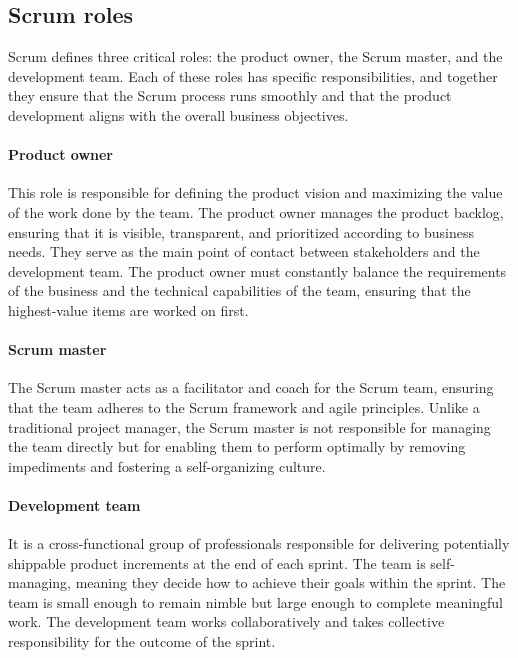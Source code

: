 \subsection{Scrum roles}

Scrum defines three critical roles: the product owner, the Scrum master, and the
development team.
Each of these roles has specific responsibilities, and together they ensure that the Scrum
process runs smoothly and that the product development aligns with the overall business
objectives.

\paragraph{Product owner} This role is responsible for defining the product vision and
    maximizing the value of the work done by the team. The product owner manages the
    product backlog, ensuring that it is visible, transparent, and prioritized according
    to business needs. They serve as the main point of contact between stakeholders and
    the development team. The product owner must constantly
    balance the requirements of the business and the technical capabilities of the team,
    ensuring that the highest-value items are worked on first.

\paragraph{Scrum master} The Scrum master acts as a facilitator and coach for the Scrum team,
    ensuring that the team adheres to the Scrum framework and agile principles. Unlike a
    traditional project manager, the Scrum master is not responsible for managing the team
    directly but for enabling them to perform optimally by removing impediments and
    fostering a self-organizing culture.

\paragraph{Development team} It is a cross-functional group of professionals
    responsible for delivering potentially shippable product increments at the end of each
    sprint. The team is self-managing, meaning they decide how to achieve their goals
    within the sprint. The team is small enough to remain nimble but large enough
    to complete meaningful work. The development team works
    collaboratively and takes collective responsibility for the outcome of the sprint.

